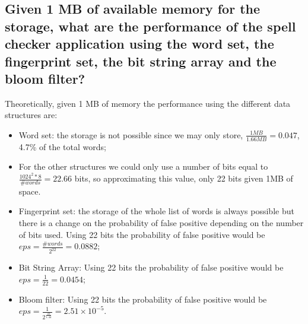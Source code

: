 \documentclass{report}
\begin{document}
{\begin{table}[h!]
				\end{table}
				
				\subsection{Given 1 MB of available memory for the storage, what are the performance of the spell checker application using the word set, the fingerprint set, the bit string array and the bloom filter?}
				Theoretically, given 1 MB of memory the performance using the different data structures are:
				\begin{itemize}
					\item Word set: the storage is not possible since we may only store, $\frac{1MB}{1.66MB}=0.047$, 4.7\% of the total words;
					\item[] For the other structures we could only use a number of bits equal to $\frac{1024^2*8}{\#words}=22.66$ bits, so approximating this value, only 22 bits given 1MB of space.
					\item Fingerprint set: the storage of the whole list of words is always possible but there is a change on the probability of false positive depending on the number of bits used. Using 22 bits the probability of false positive would be $eps=\frac{\#words}{2^{22}}=0.0882$; 
					\item Bit String Array: Using 22 bits the probability of false positive would be $eps=\frac{1}{22}=0.0454$;
					\item Bloom filter: Using 22 bits the probability of false positive would be $eps=\frac{1}{2^{\frac{22}{1.44}}}=2.51 \times 10^{-5}$. 
				\end{itemize}
				

}
\end{document}
